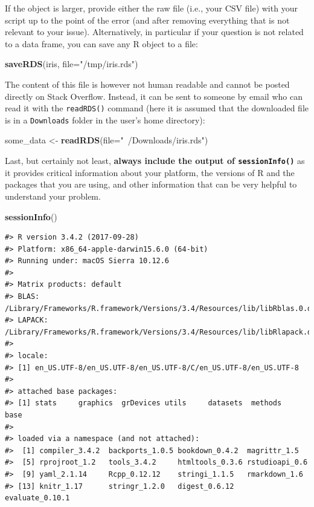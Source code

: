 \documentclass[]{book}
\newenvironment{Shaded}{\begin{snugshade}}{\end{snugshade}}
\newcommand{\KeywordTok}[1]{\textcolor[rgb]{0.13,0.29,0.53}{\textbf{#1}}}
\newcommand{\DataTypeTok}[1]{\textcolor[rgb]{0.13,0.29,0.53}{#1}}
\newcommand{\StringTok}[1]{\textcolor[rgb]{0.31,0.60,0.02}{#1}}
\newcommand{\NormalTok}[1]{#1}
\theoremstyle{definition}
\theoremstyle{definition}
\theoremstyle{remark}
\begin{document}
If the object is larger, provide either the raw file (i.e., your CSV
file) with your script up to the point of the error (and after removing
everything that is not relevant to your issue). Alternatively, in
particular if your question is not related to a data frame, you can save
any R object to a file:

\begin{Shaded}
\begin{Highlighting}[]
\KeywordTok{saveRDS}\NormalTok{(iris, }\DataTypeTok{file=}\StringTok{"/tmp/iris.rds"}\NormalTok{)}
\end{Highlighting}
\end{Shaded}

The content of this file is however not human readable and cannot be
posted directly on Stack Overflow. Instead, it can be sent to someone by
email who can read it with the \texttt{readRDS()} command (here it is
assumed that the downloaded file is in a \texttt{Downloads} folder in
the user's home directory):

\begin{Shaded}
\begin{Highlighting}[]
\NormalTok{some_data <-}\StringTok{ }\KeywordTok{readRDS}\NormalTok{(}\DataTypeTok{file=}\StringTok{"~/Downloads/iris.rds"}\NormalTok{)}
\end{Highlighting}
\end{Shaded}

Last, but certainly not least, \textbf{always include the output of
\texttt{sessionInfo()}} as it provides critical information about your
platform, the versions of R and the packages that you are using, and
other information that can be very helpful to understand your problem.

\begin{Shaded}
\begin{Highlighting}[]
\KeywordTok{sessionInfo}\NormalTok{()}
\end{Highlighting}
\end{Shaded}

\begin{verbatim}
#> R version 3.4.2 (2017-09-28)
#> Platform: x86_64-apple-darwin15.6.0 (64-bit)
#> Running under: macOS Sierra 10.12.6
#> 
#> Matrix products: default
#> BLAS: /Library/Frameworks/R.framework/Versions/3.4/Resources/lib/libRblas.0.dylib
#> LAPACK: /Library/Frameworks/R.framework/Versions/3.4/Resources/lib/libRlapack.dylib
#> 
#> locale:
#> [1] en_US.UTF-8/en_US.UTF-8/en_US.UTF-8/C/en_US.UTF-8/en_US.UTF-8
#> 
#> attached base packages:
#> [1] stats     graphics  grDevices utils     datasets  methods   base     
#> 
#> loaded via a namespace (and not attached):
#>  [1] compiler_3.4.2  backports_1.0.5 bookdown_0.4.2  magrittr_1.5   
#>  [5] rprojroot_1.2   tools_3.4.2     htmltools_0.3.6 rstudioapi_0.6 
#>  [9] yaml_2.1.14     Rcpp_0.12.12    stringi_1.1.5   rmarkdown_1.6  
#> [13] knitr_1.17      stringr_1.2.0   digest_0.6.12   evaluate_0.10.1
\end{verbatim}
\end{document}
